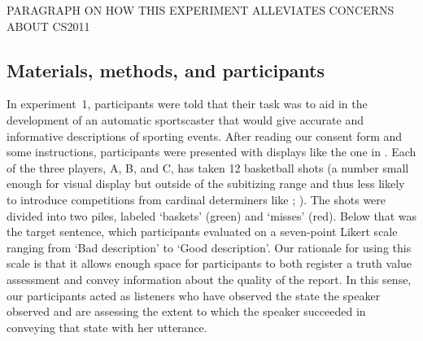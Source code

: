 \documentclass[leqno]{article}
\begin{document}
PARAGRAPH ON HOW THIS EXPERIMENT ALLEVIATES CONCERNS ABOUT CS2011

\subsection{Materials, methods, and participants}


In experiment~1, participants were told that their task was to aid in
the development of an automatic sportscaster that would give accurate
and informative descriptions of sporting events. After reading our
consent form and some instructions, participants were presented with
displays like the one in . Each of the three players,
A, B, and C, has taken 12 basketball shots (a number small enough for
visual display but outside of the subitizing range and thus less
likely to introduce competitions from cardinal determiners like
; \citealt{Degen:Tanenhaus:2014}). The shots were
divided into two piles, labeled `baskets' (green) and `misses'
(red). Below that was the target sentence, which participants
evaluated on a seven-point Likert scale ranging from `Bad description'
to `Good description'. Our rationale for using this scale is that it
allows enough space for participants to both register a truth value
assessment and convey information about the quality of the report. In
this sense, our participants acted as listeners who have observed the
state the speaker observed and are assessing the extent to which the speaker
succeeded in conveying that state with her utterance.
\end{document}
